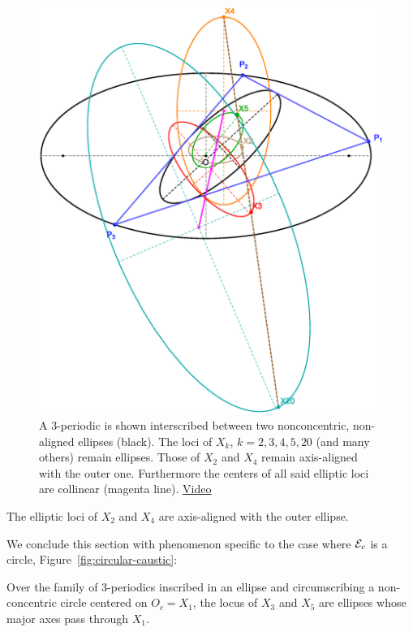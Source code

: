 \begin{figure}
     \centering
     \includegraphics[width=.8\textwidth]{pics/0090_n3_nonconcentric_conics.eps}
     \caption{A 3-periodic is shown interscribed between two nonconcentric, non-aligned ellipses (black). The loci of $X_k$, $k=2,3,4,5,20$ (and many others) remain ellipses. Those of $X_2$ and $X_4$ remain axis-aligned with the outer one. Furthermore the centers of all said elliptic loci are collinear (magenta line). \href{https://youtu.be/p1medAei_As}{Video}}
     \label{fig:nonconcentric-xns}
 \end{figure}
 
 
\begin{observation}
The elliptic loci of $X_2$ and $X_4$ are axis-aligned with the outer ellipse.
\end{observation} 

We conclude this section with phenomenon specific to the case where $\mathcal{E}_c$ is a circle, Figure~\ref{fig:circular-caustic}:

\begin{observation}
 Over the family of 3-periodics inscribed in an ellipse and circumscribing a non-concentric circle centered on $O_c=X_1$, the locus of $X_3$ and $X_5$ are ellipses whose major axes pass through $X_1$.
 \end{observation}
 
